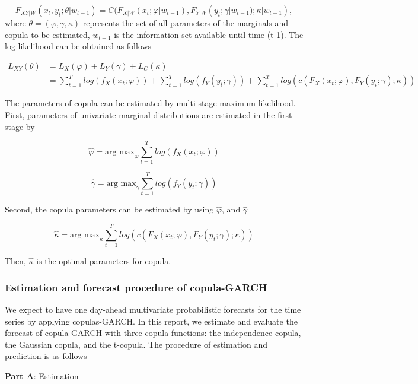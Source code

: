 \documentclass[12pt,a4paper]{article}
\numberwithin{equation}{section}
\begin{document}
 \[F_{XY|W}(x_t, y_t; \theta|w_{t-1}) = C(F_{X|W}(x_t; \varphi|w_{t-1}), F_{Y|W}(y_t; \gamma|w_{t-1}); \kappa|w_{t-1}),\]
 where $\theta = (\varphi, \gamma, \kappa)$ represents the set of all parameters of the marginals and copula to be estimated, $w_{t-1}$ is the information set available until time (t-1). The log-likelihood can be obtained as follows
 
 \begin{align*}
 L_{XY}(\theta) &= L_X(\varphi) + L_Y(\gamma) + L_C(\kappa) \\
 		       &= \sum_{t=1}^{T} log(f_X(x_t;\varphi)) + \sum_{t=1}^{T} log(f_Y(y_t;\gamma)) + \sum_{t=1}^{T}log(c(F_X(x_t;\varphi), F_Y(y_t;\gamma);\kappa))
 \end{align*}
 
 The parameters of copula can be estimated by multi-stage maximum likelihood. First, parameters of univariate marginal distributions are estimated in the first stage by
 
 \[\hat{\varphi} = \text{arg max}_ \varphi \sum_{t=1}^{T} log(f_X(x_t;\varphi))\]
 
  \[\hat{\gamma} = \text{arg max}_ \gamma \sum_{t=1}^{T} log(f_Y(y_t;\gamma))\]
 
 Second, the copula parameters can be estimated by using $\hat{\varphi}$, and $\hat{\gamma}$
 
  \[\hat{\kappa} = \text{arg max}_ \kappa \sum_{t=1}^{T}log(c(F_X(x_t;\varphi), F_Y(y_t;\gamma);\kappa))\]
  
  Then, $\hat{\kappa}$ is the optimal parameters for copula.
 
 \subsubsection{Estimation and forecast procedure of copula-GARCH}
 We expect to have one day-ahead multivariate probabilistic forecasts for the time series by applying copulas-GARCH. In this report, we estimate and evaluate the forecast of copula-GARCH with three copula functions: the independence copula, the Gaussian copula, and the t-copula. The procedure of estimation and prediction is as follows

\textbf{Part A}: Estimation
\end{document}

